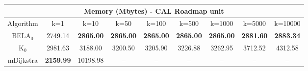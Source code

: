 \begin{tabular}{c|cccccccc}\toprule
\multicolumn{9}{c}{Memory (Mbytes) - CAL Roadmap unit}\\ \midrule
Algorithm & k=1 & k=10 & k=50 & k=100 & k=500 & k=1000 & k=5000 & k=10000 \\ \midrule
BELA$_0$ & 2749.14 & \textbf{2865.00} & \textbf{2865.00} & \textbf{2865.00} & \textbf{2865.00} & \textbf{2865.00} & \textbf{2881.60} & \textbf{2883.34} \\
K$_0$ & 2981.63 & 3188.00 & 3200.50 & 3205.90 & 3226.88 & 3262.95 & 3712.52 & 4312.58 \\
mDijkstra & \textbf{2159.99} & 10198.98 & -- & -- & -- & -- & -- & -- \\ \bottomrule 
\end{tabular}
